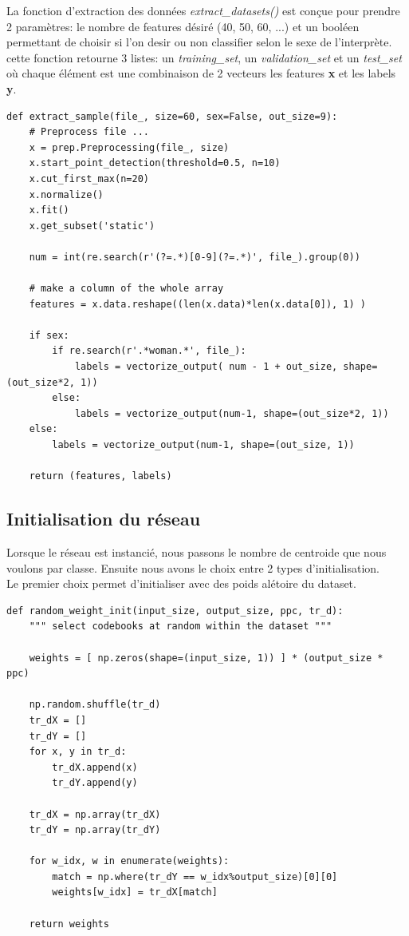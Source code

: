 \documentclass[11pt]{article}
\begin{document}
La fonction d'extraction des donn\'ees {\em extract\_datasets()}
est con\c{c}ue pour prendre 2 param\`etres: le nombre de features d\'esir\'e
(40, 50, 60, ...) et un bool\'een permettant de choisir si l'on desir ou non
classifier selon le sexe de l'interpr\`ete. cette fonction retourne 3 listes:
un {\em training\_set}, un {\em validation\_set} et un {\em test\_set} o\`u
chaque \'el\'ement est une combinaison de 2 vecteurs les features {\bf x} et les
labels {\bf y}.

\begin{lstlisting}
def extract_sample(file_, size=60, sex=False, out_size=9):
    # Preprocess file ...
    x = prep.Preprocessing(file_, size)
    x.start_point_detection(threshold=0.5, n=10)
    x.cut_first_max(n=20)
    x.normalize()
    x.fit()
    x.get_subset('static')

    num = int(re.search(r'(?=.*)[0-9](?=.*)', file_).group(0))

    # make a column of the whole array
    features = x.data.reshape((len(x.data)*len(x.data[0]), 1) )

    if sex:
        if re.search(r'.*woman.*', file_):
            labels = vectorize_output( num - 1 + out_size, shape=(out_size*2, 1))
        else:
            labels = vectorize_output(num-1, shape=(out_size*2, 1))
    else:
        labels = vectorize_output(num-1, shape=(out_size, 1))

    return (features, labels)

\end{lstlisting}

\subsection{Initialisation du r\'eseau}
Lorsque le r\'eseau est instanci\'e, nous passons le nombre de centroide que nous voulons par classe.
Ensuite nous avons le choix entre 2 types d'initialisation.\\
Le premier choix permet d'initialiser avec des poids al\'etoire du dataset.

\begin{lstlisting}
def random_weight_init(input_size, output_size, ppc, tr_d):
    """ select codebooks at random within the dataset """

    weights = [ np.zeros(shape=(input_size, 1)) ] * (output_size * ppc)

    np.random.shuffle(tr_d)
    tr_dX = []
    tr_dY = []
    for x, y in tr_d:
        tr_dX.append(x)
        tr_dY.append(y)

    tr_dX = np.array(tr_dX)
    tr_dY = np.array(tr_dY)

    for w_idx, w in enumerate(weights):
        match = np.where(tr_dY == w_idx%output_size)[0][0]
        weights[w_idx] = tr_dX[match]

    return weights
\end{lstlisting}
\end{document}
